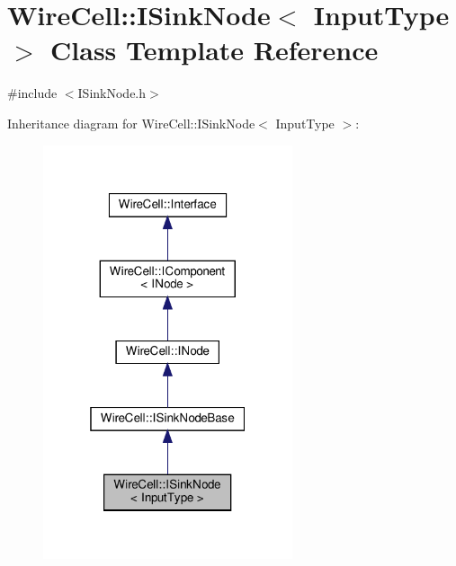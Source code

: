 \hypertarget{class_wire_cell_1_1_i_sink_node}{}\section{Wire\+Cell\+:\+:I\+Sink\+Node$<$ Input\+Type $>$ Class Template Reference}
\label{class_wire_cell_1_1_i_sink_node}


{\ttfamily \#include $<$I\+Sink\+Node.\+h$>$}



Inheritance diagram for Wire\+Cell\+:\+:I\+Sink\+Node$<$ Input\+Type $>$\+:
\nopagebreak
\begin{figure}[H]
\begin{center}
\leavevmode
\includegraphics[width=208pt]{class_wire_cell_1_1_i_sink_node__inherit__graph}
\end{center}
\end{figure}


